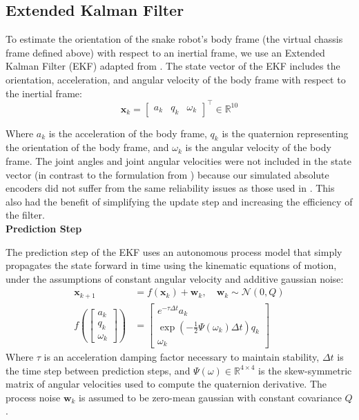 \documentclass[letterpaper, 10 pt, conference]{ieeeconf}  %
\begin{document}
\subsection{Extended Kalman Filter}
To estimate the orientation of the snake robot's body frame (the virtual chassis frame defined above) with respect to an inertial frame, we use an Extended Kalman Filter (EKF) adapted from \cite{state_est_snake_robots}. The state vector of the EKF includes the orientation, acceleration, and angular velocity of the body frame with respect to the inertial frame:
\begin{equation}
    \mathbf{x}_k = \begin{bmatrix}
        a_k & q_k & \omega_k
    \end{bmatrix}^\top \in \mathbb{R}^{10}
\end{equation}



Where $a_k$ is the acceleration of the body frame, $q_k$ is the quaternion representing the orientation of the body frame, and $\omega_k$ is the angular velocity of the body frame. The joint angles and joint angular velocities were not included in the state vector (in contrast to the formulation from \cite{snake_paper2}) because our simulated absolute encoders did not suffer from the same reliability issues as those used in \cite{snake_paper2}. This also had the benefit of simplifying the update step and increasing the efficiency of the filter. \\

\noindent \textbf{Prediction Step}

The prediction step of the EKF uses an autonomous process model that simply propagates the state forward in time using the kinematic equations of motion, under the assumptions of constant angular velocity and additive gaussian noise:
\begin{align}
\mathbf{x}_{k+1} &= f(\mathbf{x}_k) + \mathbf{w}_k, \quad \mathbf{w}_k \sim \mathcal{N}(0, Q) \\
f\left(\begin{bmatrix}
    a_k \\ q_k \\ \omega_k
\end{bmatrix}\right) &= \begin{bmatrix}
    e^{-\tau \Delta t} a_k \\
    \exp\left(-\frac{1}{2} \Psi(\omega_k) \Delta t\right) q_k \\
    \omega_k
\end{bmatrix}
\end{align} 
Where $\tau$ is an acceleration damping factor necessary to maintain stability, $\Delta t$ is the time step between prediction steps, and $\Psi(\omega) \in \mathbb{R}^{4 \times 4}$ is the skew-symmetric matrix of angular velocities used to compute the quaternion derivative. The process noise $\mathbf{w}_k$ is assumed to be zero-mean gaussian with constant covariance $Q$. 
\end{document}
